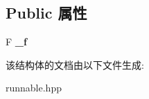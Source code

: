\subsection*{Public 属性}
\begin{DoxyCompactItemize}
\item 
\mbox{\label{structRunnable_1_1functor__t_a72162d31c1f95156de5b7cea5c481faf}} 
F {\bfseries \+\_\+f}
\end{DoxyCompactItemize}


该结构体的文档由以下文件生成\+:\begin{DoxyCompactItemize}
\item 
runnable.\+hpp\end{DoxyCompactItemize}
